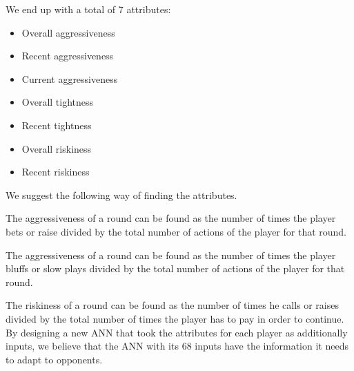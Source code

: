 We end up with a total of 7 attributes:
\begin{itemize}
\item Overall aggressiveness
\item Recent aggressiveness
\item Current aggressiveness
\item Overall tightness
\item Recent tightness
\item Overall riskiness
\item Recent riskiness
\end{itemize}

We suggest the following way of finding the attributes.

The aggressiveness of a round can be found as the number of times the player bets or raise divided by the total number of actions of the player for that round.

The aggressiveness of a round can be found as the number of times the player bluffs or slow plays divided by the total number of actions of the player for that round.

The riskiness of a round can be found as the number of times he calls or raises divided by the total number of times the player has to pay in order to continue.\\


By designing a new ANN that took the attributes for each player as additionally inputs, we believe that the ANN with its 68 inputs have the information it needs to adapt to opponents.
